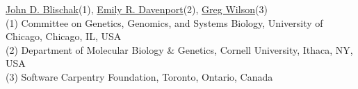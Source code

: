 \href{https://www.authorea.com/users/5990}{John D. Blischak}(1), \href{https://www.authorea.com/users/16152}{Emily R. Davenport}(2), \href{https://www.authorea.com/users/18131}{Greg Wilson}(3)\\

(1) Committee on Genetics, Genomics, and Systems Biology, University of Chicago, Chicago, IL, USA\\
(2) Department of Molecular Biology & Genetics, Cornell University, Ithaca, NY, USA\\
(3) Software Carpentry Foundation, Toronto, Ontario, Canada